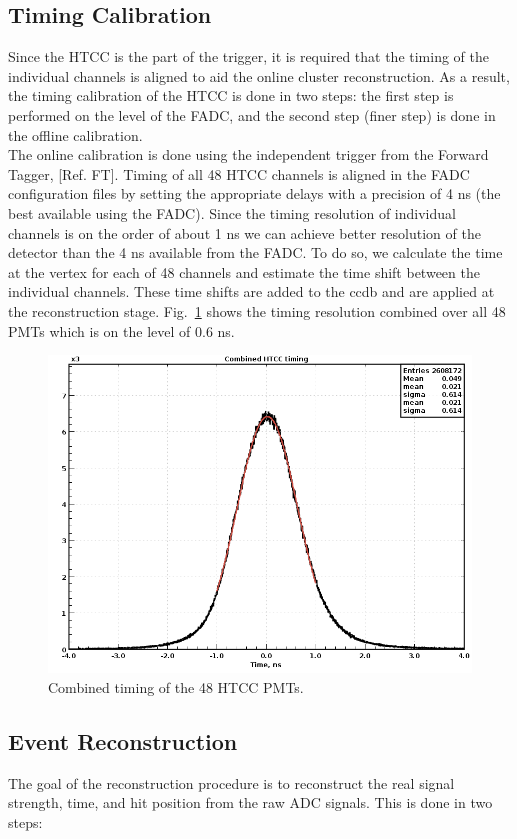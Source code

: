 \subsection{Timing Calibration} Since the HTCC is the part of the trigger, it is required that the timing of the individual channels is aligned to aid the online cluster reconstruction. As a result, the timing calibration of the HTCC is done in two steps: the first step is performed on the level of the FADC, and the second step (finer step) is done in the offline calibration. \\
\indent The online calibration is done using the independent trigger from the Forward Tagger, [Ref. FT]. Timing of all 48 HTCC channels is aligned in the FADC configuration files by setting the appropriate delays with a precision of 4 ns (the best available using the FADC). Since the timing resolution of individual channels is on the order of about 1 ns we can achieve better resolution of the detector than the 4 ns available from the FADC. To do so, we calculate the time at the vertex for each of 48 channels and estimate the time shift between the individual channels. These time shifts are added to the ccdb and are applied at the reconstruction stage. Fig.~\ref{fig:htcccombinedTimingResponce} shows the timing resolution combined over all 48 PMTs which is on the level of 0.6 ns.
\begin{figure}[ht]
\centering
\includegraphics[width=0.95\linewidth]{images/deltaTime6.png}
\caption{Combined timing of the 48 HTCC PMTs.}
\label{fig:htcccombinedTimingResponce}
\end{figure}

\subsection{Event Reconstruction} The goal of the reconstruction procedure is to reconstruct the real signal strength, time, and hit position from the raw ADC signals. This is done in two steps:

